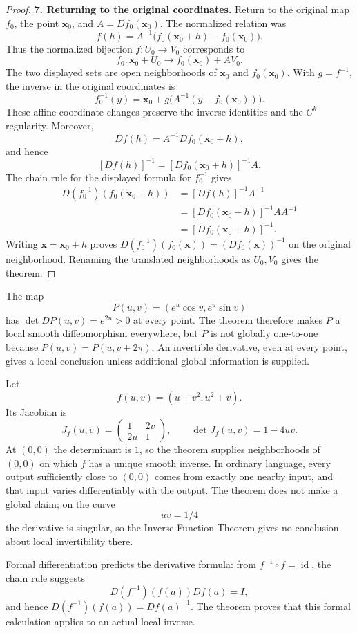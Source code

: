 \begin{proof}
\noindent\textbf{7. Returning to the original coordinates.}
Return to the original map $f_0$, the point $\mathbf{x}_0$, and
$A=Df_0(\mathbf{x}_0)$. The normalized relation was
\[
f(h)=A^{-1}\bigl(f_0(\mathbf{x}_0+h)-f_0(\mathbf{x}_0)\bigr).
\]
Thus the normalized bijection $f:U_0\to V_0$ corresponds to
\[
f_0:\mathbf{x}_0+U_0\longrightarrow f_0(\mathbf{x}_0)+AV_0.
\]
The two displayed sets are open neighborhoods of $\mathbf{x}_0$ and $f_0(\mathbf{x}_0)$.
With $g=f^{-1}$, the inverse in the original coordinates is
\[
f_0^{-1}(y)=\mathbf{x}_0+g\bigl(A^{-1}(y-f_0(\mathbf{x}_0))\bigr).
\]
These affine coordinate changes preserve the inverse identities and the
$C^k$ regularity. Moreover,
\[
Df(h)=A^{-1}Df_0(\mathbf{x}_0+h),
\]
and hence
\[
[Df(h)]^{-1}
=[Df_0(\mathbf{x}_0+h)]^{-1}A.
\]
The chain rule for the displayed formula for $f_0^{-1}$ gives
\[
\begin{aligned}
D(f_0^{-1})(f_0(\mathbf{x}_0+h))
&=[Df(h)]^{-1}A^{-1}\\
&=[Df_0(\mathbf{x}_0+h)]^{-1}AA^{-1}\\
&=[Df_0(\mathbf{x}_0+h)]^{-1}.
\end{aligned}
\]
Writing $\mathbf{x}=\mathbf{x}_0+h$ proves
$D(f_0^{-1})(f_0(\mathbf{x}))=(Df_0(\mathbf{x}))^{-1}$ on the original neighborhood.
Renaming the translated neighborhoods as $U_0,V_0$ gives the theorem.
\end{proof}

\begin{example}
The map
\[
P(u,v)=(e^u\cos v,e^u\sin v)
\]
has $\det DP(u,v)=e^{2u}>0$ at every point. The theorem therefore makes
$P$ a local smooth diffeomorphism everywhere, but $P$ is not globally
one-to-one because $P(u,v)=P(u,v+2\pi)$. An invertible derivative, even
at every point, gives a local conclusion unless additional global
information is supplied.
\end{example}
\begin{example}
Let
\[
f(u,v)=(u+v^2,u^2+v).
\]
Its Jacobian is
\[
J_f(u,v)=
\begin{pmatrix}1&2v\\2u&1\end{pmatrix},
\qquad
\det J_f(u,v)=1-4uv.
\]
At $(0,0)$ the determinant is $1$, so the theorem supplies neighborhoods of
$(0,0)$ on which $f$ has a unique smooth inverse. In ordinary language,
every output sufficiently close to $(0,0)$ comes from exactly one nearby
input, and that input varies differentiably with the output.  The theorem
does not make a global claim; on the curve
\[
uv=1/4
\]
 the derivative is
singular, so the Inverse Function Theorem gives no conclusion about local
invertibility there.

Formal differentiation predicts the derivative formula:
from $f^{-1}\circ f=\operatorname{id}$, the chain rule suggests
\[
D(f^{-1})(f(a))Df(a)=I,
\]
and hence $D(f^{-1})(f(a))=Df(a)^{-1}$.  The theorem proves that this
formal calculation applies to an actual local inverse.
\end{example}

